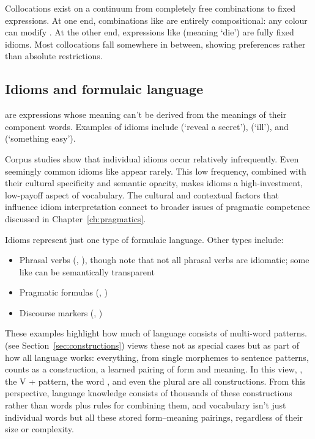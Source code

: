 Collocations exist on a continuum from completely free combinations to fixed expressions. At one end, combinations like  are entirely compositional: any colour can modify . At the other end, expressions like  (meaning `die') are fully fixed idioms. Most collocations fall somewhere in between, showing preferences rather than absolute restrictions.

\subsection{Idioms and formulaic language}

 are expressions whose meaning can't be derived from the meanings of their component words. Examples of idioms include  (`reveal a secret'),  (`ill'), and  (`something easy').

Corpus studies show that individual idioms occur relatively infrequently. Even seemingly common idioms like  appear rarely. This low frequency, combined with their cultural specificity and semantic opacity, makes idioms a high-investment, low-payoff aspect of vocabulary. The cultural and contextual factors that influence idiom interpretation connect to broader issues of pragmatic competence discussed in Chapter~\ref{ch:pragmatics}.

Idioms represent just one type of formulaic language. Other types include:
\begin{itemize}[noitemsep]
\item Phrasal verbs (, ), though note that not all phrasal verbs are idiomatic; some like  can be semantically transparent
\item Pragmatic formulas (, )
\item Discourse markers (, )
\end{itemize}

These examples highlight how much of language consists of multi-word patterns.  (see Section~\ref{sec:constructions}) views these not as special cases but as part of how all language works: everything, from single morphemes to sentence patterns, counts as a construction, a learned pairing of form and meaning. In this view, , the V +  pattern, the word , and even the plural  are all constructions. From this perspective, language knowledge consists of thousands of these constructions rather than words plus rules for combining them, and vocabulary isn't just individual words but all these stored form--meaning pairings, regardless of their size or complexity.

